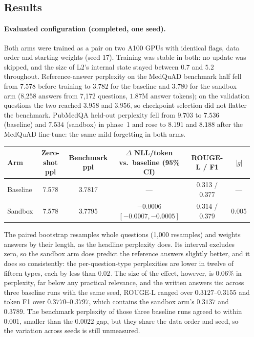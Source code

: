 \documentclass[11pt,a4paper]{article}
\theoremstyle{plain}
\theoremstyle{definition}
\theoremstyle{remark}
\begin{document}
\subsection{Results}
\label{sec:results}

\noindent
\paragraph{Evaluated configuration (completed, one seed).}
Both arms were trained as a pair on two A100 GPUs with identical flags, data
order and starting weights (seed 17). Training was stable in both: no update
was skipped, and the size of L2's internal state stayed between $0.7$ and
$5.2$ throughout. Reference-answer perplexity on the MedQuAD benchmark half
fell from $7.578$ before training to $3.782$ for the baseline and $3.780$ for
the sandbox arm (8{,}258 answers from 7{,}172 questions, $1.87$M answer tokens);
on the validation questions the two reached $3.958$ and $3.956$, so checkpoint
selection did not flatter the benchmark. PubMedQA held-out perplexity fell
from $9.703$ to $7.536$ (baseline) and $7.534$ (sandbox) in phase~1 and rose
to $8.191$ and $8.188$ after the MedQuAD fine-tune: the same mild forgetting in
both arms.

\begin{center}
\small
\begin{tabular}{@{}lccccc@{}}
\toprule
\rowcolor{ekHeadBG}\color{white}\textbf{Arm} & \color{white}\textbf{Zero-shot ppl} & \color{white}\textbf{Benchmark ppl} & \color{white}\textbf{$\Delta$ NLL/token vs.\ baseline (95\% CI)} & \color{white}\textbf{ROUGE-L / F1} & \color{white}\textbf{$|g|$} \\
\midrule
Baseline & 7.578 & 3.7817 & --- & 0.313 / 0.377 & --- \\
Sandbox & 7.578 & 3.7795 & $-0.0006$ $[-0.0007, -0.0005]$ & 0.314 / 0.379 & 0.005 \\
\bottomrule
\end{tabular}
\end{center}

\noindent
The paired bootstrap resamples whole questions (1{,}000 resamples) and weights
answers by their length, as the headline perplexity does. Its interval
excludes zero, so the sandbox arm does predict the reference answers slightly
better, and it does so consistently: the per-question-type perplexities are
lower in twelve of fifteen types, each by less than $0.02$. The size of the
effect, however, is $0.06\%$ in perplexity, far below any practical relevance,
and the written answers tie: across three baseline runs with the same seed,
ROUGE-L ranged over $0.3127$--$0.3155$ and token F1 over $0.3770$--$0.3797$,
which contains the sandbox arm's $0.3137$ and $0.3789$. The benchmark
perplexity of those three baseline runs agreed to within $0.001$, smaller
than the $0.0022$ gap, but they share the data order and seed, so the
variation across seeds is still unmeasured.
\end{document}
